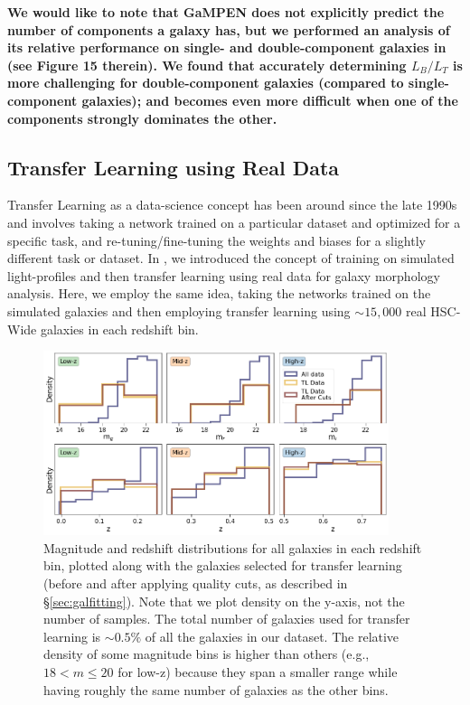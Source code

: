 \documentclass[linenumbers,twocolumn,twocolappendix]{aastex631}
\newcommand\gampen{GaMPEN}
\begin{document}
\begin{CJK*}{UTF8}{gbsn}
\textbf{We would like to note that \gampen{} does not explicitly predict the number of components a galaxy has, but we performed an analysis of its relative performance on single- and double-component galaxies in \citet{gampen_software_paper} (see Figure 15 therein). We found that accurately determining $L_B/L_T$ is more challenging for double-component galaxies (compared to single-component galaxies); and becomes even more difficult when one of the components strongly dominates the other.}

\subsection{Transfer Learning using Real Data} 
\label{sec:transfer_learning}

Transfer Learning as a data-science concept has been around since the late 1990s \citep[e.g.,][]{blum_1998} and involves taking a network trained on a particular dataset and optimized for a specific task, and re-tuning/fine-tuning the weights and biases for a slightly different task or dataset.  In \citet{gamornet_paper}, we introduced the concept of training on simulated light-profiles and then transfer learning using real data for galaxy morphology analysis. Here, we employ the same idea, taking the networks trained on the simulated galaxies and then employing transfer learning using $\sim15,000$ real HSC-Wide galaxies in each redshift bin.

\begin{figure}[htb]
    \centering
    \includegraphics[width = 0.9\textwidth]{tl_para_dist.png}
    \caption{Magnitude and redshift distributions for all galaxies in each redshift bin, plotted along with the galaxies selected for transfer learning (before and after applying quality cuts, as described in \S \ref{sec:galfitting}). Note that we plot density on the y-axis, not the number of samples. The total number of galaxies used for transfer learning is $\sim0.5\%$ of all the galaxies in our dataset. The relative density of some magnitude bins is higher than others (e.g., $18 < m \leq 20$ for low-z) because they span a smaller range while having roughly the same number of galaxies as the other bins.}
    \label{fig:tl_para_dist}
\end{figure}


\end{CJK*}
\end{document}
